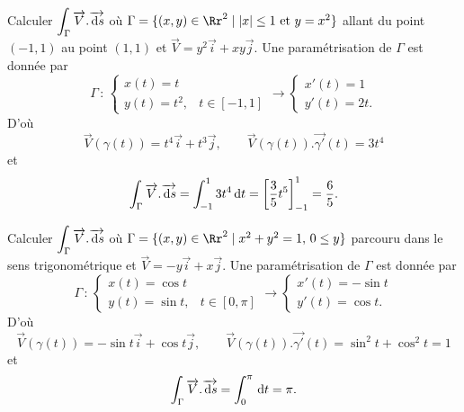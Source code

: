 \documentclass[class=report,crop=false]{standalone}
\begin{document}
Calculer $\displaystyle \int _{\Gamma }\overrightarrow{V}.\overrightarrow{\,\mathrm{d} s}$ o\`u $\Gamma =\{(x,y)\in \Rr^2\mid |x|\leq 1 \mbox{ et }y=x^2\}$ allant du point $(-1,1)$ au point $(1,1)$ et $\overrightarrow{V}=y^2\vec{i}+xy\vec{j}$. Une paramétrisation de $\Gamma$ est donnée par
$$\Gamma \,:\,\left\{\begin{array}{ll}x(t)=t &\\ y(t)=t^2,&t\in [-1,1]\end{array}\right. \rightarrow \left\{\begin{array}{l}x'(t)=1 \\ y'(t)=2t.\end{array}\right.$$
D'o\`u 
$$\overrightarrow{V}(\gamma (t))=t^4\vec{i}+t^3\vec{j},\qquad \overrightarrow{V}(\gamma (t)).\overrightarrow{\gamma '}(t)=3t^4$$
et
$$\int _{\Gamma}\overrightarrow{V}.\overrightarrow{\,\mathrm{d} s}=\int _{-1}^13t^4\,\mathrm{d} t=\left[\frac{3}{5}t^5\right]_{-1}^1=\frac{6}{5}.$$

\vskip4mm

Calculer $\displaystyle \int _{\Gamma }\overrightarrow{V}.\overrightarrow{\,\mathrm{d} s}$ o\`u $\Gamma =\{(x,y)\in \Rr^2\mid x^2+y^2=1,\, 0\leq y\}$ parcouru dans le sens trigonométrique et $\overrightarrow{V}=-y\vec{i}+x\vec{j}$. Une paramétrisation de $\Gamma$ est donnée par
$$\Gamma \,:\,\left\{\begin{array}{ll}x(t)=\cos t &\\ y(t)=\sin t,&t\in [0,\pi]\end{array}\right. \rightarrow \left\{\begin{array}{l}x'(t)=-\sin t \\ y'(t)=\cos t.\end{array}\right.$$
D'o\`u 
$$\overrightarrow{V}(\gamma (t))=-\sin t\vec{i}+\cos t \vec{j},\qquad \overrightarrow{V}(\gamma (t)).\overrightarrow{\gamma '}(t)=\sin ^2t+\cos ^2t=1$$
et
$$\int _{\Gamma}\overrightarrow{V}.\overrightarrow{\,\mathrm{d} s}=\int _{0}^{\pi}\,\mathrm{d} t=\pi.$$

\vskip4mm
\end{document}
